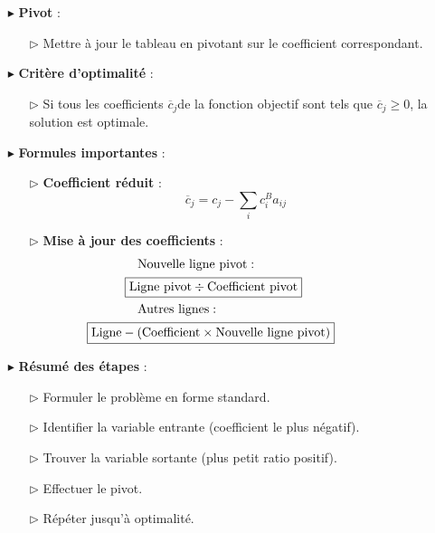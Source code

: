\documentclass{report}
\begin{document}
\begin{multicols*}{2}
\begin{itemize}
    \item[$\blacktriangleright$] \textbf{Pivot} :
    \begin{itemize}
        \item[$\rhd$] Mettre à jour le tableau en pivotant sur le coefficient correspondant.
    \end{itemize}

    \item[$\blacktriangleright$] \textbf{Critère d'optimalité} :
    \begin{itemize}
        \item[$\rhd$] Si tous les coefficients $\overline{c}_j$de la fonction objectif sont tels que 
            $\overline{c}_j \geq 0$, la solution est optimale.
    \end{itemize}

    \item[$\blacktriangleright$] \textbf{Formules importantes} :
    \begin{itemize}
        \item[$\rhd$] \textbf{Coefficient réduit} :
        \[
        \boxed{\overline{c}_j = c_j - \sum_{i} c_i^{B} a_{ij}}
        \]
        \item[$\rhd$] \textbf{Mise à jour des coefficients} :
        \begin{align*}
            & \text{Nouvelle ligne pivot} : 
         \\ &\quad \hspace{-2em}\boxed{\text{Ligne pivot} \div \text{Coefficient pivot}} \\
            & \text{Autres lignes} : 
         \\ &\hspace{-4em}\boxed{\text{Ligne} - (\text{Coefficient} \times \text{Nouvelle ligne pivot})}
        \end{align*}
    \end{itemize}

    \item[$\blacktriangleright$] \textbf{Résumé des étapes} :
    \begin{enumerate}
        \item[$\rhd$] Formuler le problème en forme standard.
        \item[$\rhd$] Identifier la variable entrante (coefficient le plus négatif).
        \item[$\rhd$] Trouver la variable sortante (plus petit ratio positif).
        \item[$\rhd$] Effectuer le pivot.
        \item[$\rhd$] Répéter jusqu'à optimalité.
    \end{enumerate}
\end{itemize}


\end{multicols*}
\end{document}

